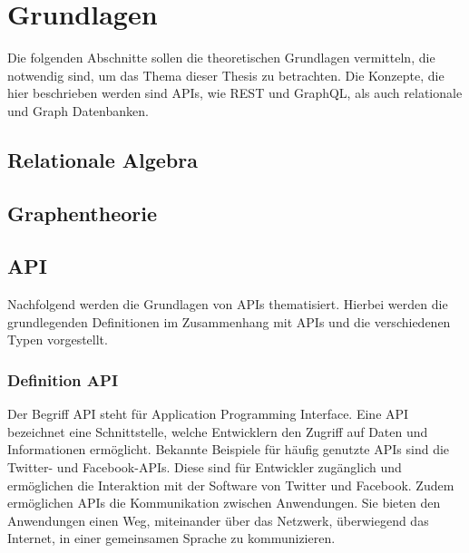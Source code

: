 \chapter{Grundlagen} %
\label{sec:grundlagen}
Die folgenden Abschnitte sollen die theoretischen Grundlagen vermitteln, die notwendig sind, um das Thema dieser Thesis zu betrachten. Die Konzepte, die hier beschrieben werden sind APIs, wie REST und GraphQL, als auch relationale und Graph Datenbanken.
\section{Relationale Algebra} %
\label{sec:relationaleAlgebra}

\section{Graphentheorie} %
\label{sec:graphentheorie}

\section{API} %
\label{sec:apigrundlagen}
Nachfolgend werden die Grundlagen von APIs thematisiert. Hierbei werden die grundlegenden Definitionen im Zusammenhang mit APIs und die verschiedenen Typen vorgestellt.
\subsection{Definition API} %
\label{sec:grundlegendedefinitionvonapi}
Der Begriff \glqq API\grqq{}  steht für \glqq Application Programming Interface\grqq{}. Eine API bezeichnet eine Schnittstelle, welche Entwicklern den Zugriff auf Daten und Informationen ermöglicht. Bekannte Beispiele für häufig genutzte APIs sind die Twitter- und Facebook-APIs. Diese sind für Entwickler zugänglich und ermöglichen die Interaktion mit der Software von Twitter und Facebook. Zudem ermöglichen APIs die Kommunikation zwischen Anwendungen. Sie bieten den Anwendungen einen Weg, miteinander über das Netzwerk, überwiegend das Internet, in einer gemeinsamen Sprache zu kommunizieren. \citep{apistrategyguide}
